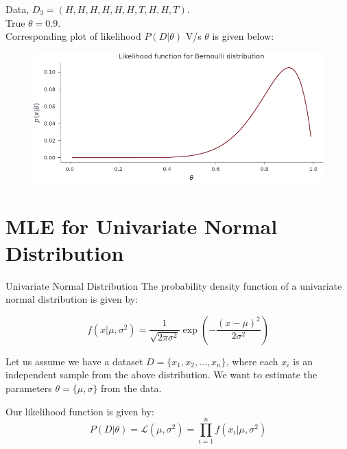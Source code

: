 \documentclass{beamer}
\begin{document}
\begin{frame}
    Data, $D_3 = (H,H,H,H,H,H,T,H,H,T)$. \\True $\theta=0.9.$ \\Corresponding plot of likelihood $P(D|\theta)$ V/s $\theta$ is given below:
    \begin{figure}
                \centerline{\includegraphics[scale = 0.75]{../figures/mle/bernoulli_likelihood_2.pdf}}
\end{figure}
\end{frame}



\section{MLE for Univariate Normal Distribution}

\begin{frame}{Univariate Normal Distribution}
The probability density function of a univariate normal distribution is given by:

\begin{equation}
f(x|\mu, \sigma^2) = \frac{1}{\sqrt{2\pi\sigma^2}}\exp\left(-\frac{(x-\mu)^2}{2\sigma^2}\right)
\end{equation}

Let us assume we have a dataset $D = \{x_1, x_2, \ldots, x_n\}$, where each $x_i$ is an independent sample from the above distribution. 
We want to estimate the parameters $\theta = \{\mu, \sigma\}$ from the data.

Our likelihood function is given by:
\begin{equation}
P(D|\theta) = \mathcal{L}(\mu, \sigma^2) = \prod_{i=1}^n f(x_i|\mu, \sigma^2)
\end{equation}


\end{frame}
\end{document}
